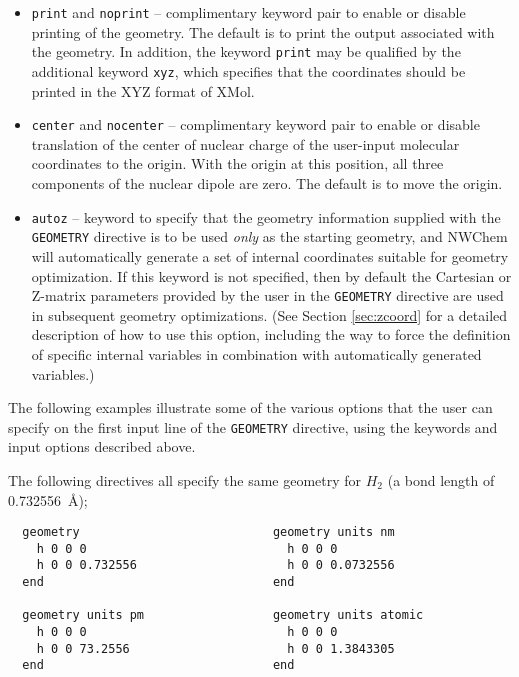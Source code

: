 \begin{itemize}
\item \verb+print+ and \verb+noprint+ -- complimentary keyword pair to
enable or disable printing of the geometry.  The default is to print   
the output associated with the geometry.  In addition, the keyword 
\verb+print+ may
be qualified by the additional keyword \verb+xyz+, which specifies
that the coordinates should be printed in the XYZ format of XMol.

\item \verb+center+ and \verb+nocenter+ -- complimentary keyword pair
  to enable or disable translation of the center of nuclear charge of
  the user-input molecular coordinates to the origin.  With the
  origin at this position, all three components of the nuclear dipole
  are zero.  The default is to move the origin.

\item \verb+autoz+ -- keyword to specify that the geometry 
information supplied
with the \verb+GEOMETRY+ directive is to be used {\em only} as the starting
geometry, and NWChem will automatically generate a set of internal coordinates
suitable for geometry optimization.  If this keyword is not specified, then
by default the Cartesian or Z-matrix parameters provided by the user
in the \verb+GEOMETRY+ directive are used in subsequent geometry
optimizations. 
(See Section \ref{sec:zcoord} for a detailed description of how to
use this option, including the way to
force the definition of specific internal variables in combination
with automatically generated variables.)
\end{itemize}

The following examples illustrate some of the various options that the user
can specify on the first input line of the \verb+GEOMETRY+ directive, using
the keywords and input options described above.

The following directives all specify the same geometry for $H_2$
(a bond length of 0.732556\ \AA);
\begin{verbatim}
  geometry                           geometry units nm    
    h 0 0 0                            h 0 0 0            
    h 0 0 0.732556                     h 0 0 0.0732556    
  end                                end                  

  geometry units pm                  geometry units atomic 
    h 0 0 0                            h 0 0 0             
    h 0 0 73.2556                      h 0 0 1.3843305     
  end                                end                   
\end{verbatim}
      
